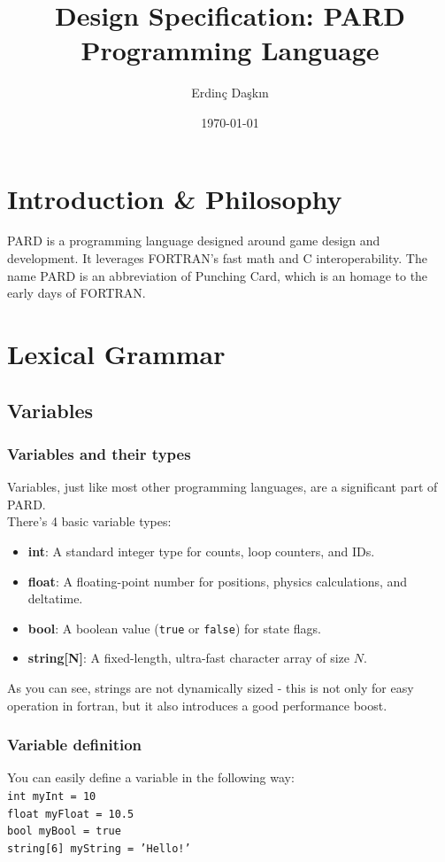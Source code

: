 \documentclass[11pt,a4paper]{article}
\title{Design Specification: PARD Programming Language}
\author{Erdinç Daşkın}
\date{\today}
\begin{document}
\maketitle
\tableofcontents
\newpage

\section{Introduction \& Philosophy}
PARD is a programming language designed around game design and development.
It leverages FORTRAN's fast math and C interoperability.
The name PARD is an abbreviation of Punching Card, which is an homage to the early days of FORTRAN.
\section{Lexical Grammar}
\subsection{Variables}
\subsubsection{Variables and their types}
Variables, just like most other programming languages, are a significant part of PARD. \\
There's 4 basic variable types:
\begin{itemize}
    \item \textbf{int}: A standard integer type for counts, loop counters, and IDs.
    \item \textbf{float}: A floating-point number for positions, physics calculations, and deltatime.
    \item \textbf{bool}: A boolean value (\texttt{true} or \texttt{false}) for state flags.
    \item \textbf{string[N]}: A fixed-length, ultra-fast character array of size $N$.
\end{itemize}
As you can see, strings are not dynamically sized - this is not only for easy operation in fortran, but it also introduces a good performance boost.
\subsubsection{Variable definition}
You can easily define a variable in the following way: \\
\texttt{int myInt = 10} \\
\texttt{float myFloat = 10.5} \\
\texttt{bool myBool = true} \\ 
\texttt{string[6] myString = 'Hello!'}
\end{document}
